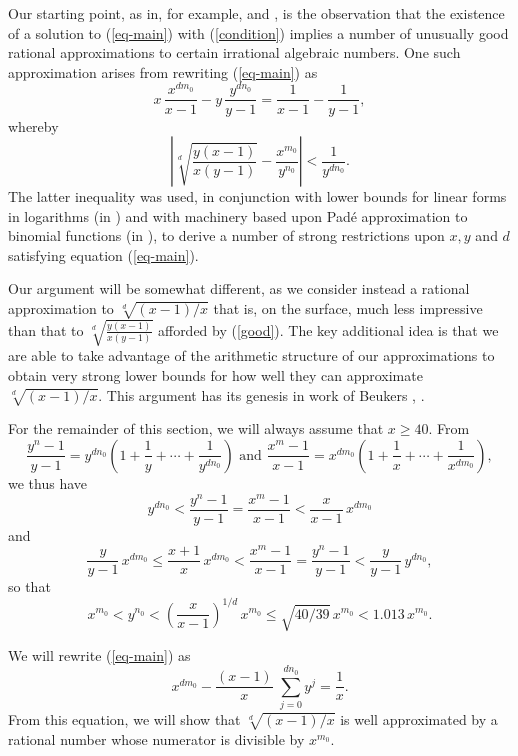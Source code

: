 Our starting point, as in, for example, \cite{BuSh} and \cite{NeSh}, is the observation that the existence of a solution to (\ref{eq-main}) with (\ref{condition}) implies a number of unusually good rational approximations to certain irrational algebraic numbers. One such approximation arises from rewriting (\ref{eq-main}) as 
$$
x \, \frac{x^{d m_0}}{x-1} - y \, \frac{y^{d n_0}}{y-1} = \frac{1}{x-1} - \frac{1}{y-1},
$$
whereby
\begin{equation} \label{good}
\left| \sqrt[d]{\frac{y(x-1)}{x(y-1)}} - \frac{x^{m_0}}{y^{n_0}} \right| < \frac{1}{y^{d n_0}}.
\end{equation}
The latter inequality was used, in conjunction with lower bounds for linear forms in logarithms (in \cite{NeSh}) and with machinery based upon Pad\'e approximation to binomial functions (in \cite{BuSh}), to derive a number of strong restrictions upon $x, y$ and $d$ satisfying equation (\ref{eq-main}).

Our argument will be somewhat different, as we consider instead a rational approximation to 
$\sqrt[d]{(x-1)/x}$ that is, on the surface, much less impressive than that to $\sqrt[d]{\frac{y(x-1)}{x(y-1)}}$ afforded by (\ref{good}). The key additional idea is that we are able to take advantage of the arithmetic structure of our approximations  to obtain very strong lower bounds for how well they can approximate $\sqrt[d]{(x-1)/x}$. This argument has its genesis in work of Beukers \cite{Beu1}, \cite{Beu2}.

For the remainder of this section, we will always assume that $x \geq 40$. From
 $$
 \frac{y^n-1}{y-1} = y^{dn_0} \left( 1 + \frac{1}{y} +  \cdots + \frac{1}{y^{dn_0}} \right) \mbox{ and }  \frac{x^m-1}{x-1} = x^{dm_0} \left( 1 + \frac{1}{x} + \cdots + \frac{1}{x^{dm_0}} \right) ,
 $$
 we thus have
 $$
y^{dn_0}  <  \frac{y^n-1}{y-1} =  \frac{x^m-1}{x-1}  < \frac{x}{x-1} \,   x^{dm_0}
$$
and
$$
\frac{y}{y-1} \, x^{dm_0} \leq \frac{x+1}{x}  \, x^{dm_0} <  \frac{x^m-1}{x-1}  =  \frac{y^n-1}{y-1} 
< \frac{y}{y-1} \, y^{dn_0},
$$
so that 
\begin{equation} \label{goop}
x^{m_0} < y^{n_0} <\left( \frac{x}{x-1} \right)^{1/d} \, x^{m_0} \leq \sqrt{40/39} \, x^{m_0} < 1.013 \, x^{m_0}.
\end{equation}


We will rewrite  (\ref{eq-main})
 as 
 $$
 x^{d m_0} -  \frac{(x-1)}{x} \;   \sum_{j=0}^{dn_0} y^j = \frac{1}{x}.
 $$
 From this equation, we will show that $\sqrt[d]{(x-1)/x}$ is well approximated by a rational number whose numerator is divisible by $x^{m_0}$.
 
